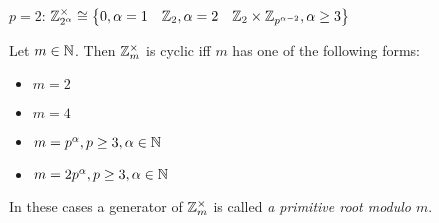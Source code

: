 \documentclass[NumTh.tex]{subfiles}
\begin{document}
$p = 2$: $\mathbb{Z}_{2^\alpha}^\times \cong \left\{0, \alpha = 1 \hspace{10pt} \mathbb{Z}_2, \alpha = 2 \hspace{10pt} \mathbb{Z}_2 \times \mathbb{Z}_{p^{\alpha -2}}, \alpha \geq 3\right\}$

\begin{cor}
  Let $m \in \mathbb{N}$. Then $\mathbb{Z}_m^\times$ is cyclic iff $m$ has one of the following forms:
  \begin{itemize}
    \item $m = 2$
    \item $m = 4$
    \item $m = p^\alpha, p \geq 3, \alpha \in \mathbb{N}$
    \item $m = 2 p^\alpha, p \geq 3, \alpha \in \mathbb{N}$
  \end{itemize}
\end{cor}

In these cases a generator of $\mathbb{Z}_m^\times$ is called \emph{a primitive root modulo $m$}.
\end{document}
